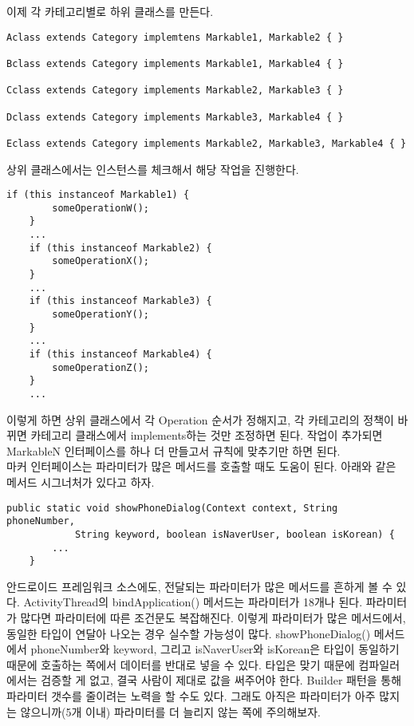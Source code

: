  
이제 각 카테고리별로 하위 클래스를 만든다.

\begin{lstlisting}[frame=single]
Aclass extends Category implemtens Markable1, Markable2 { }

Bclass extends Category implements Markable1, Markable4 { }

Cclass extends Category implements Markable2, Markable3 { }

Dclass extends Category implements Markable3, Markable4 { }

Eclass extends Category implements Markable2, Markable3, Markable4 { }
\end{lstlisting}

 
상위 클래스에서는 인스턴스를 체크해서 해당 작업을 진행한다.
\begin{lstlisting}[frame=single]
	if (this instanceof Markable1) { 
		someOperationW();
	}
 	...
	if (this instanceof Markable2) { 
		someOperationX();
	}
	...
	if (this instanceof Markable3) { 
		someOperationY(); 
	} 
	...
	if (this instanceof Markable4) { 
		someOperationZ();
	}
	...
\end{lstlisting}
이렇게 하면 상위 클래스에서 각 Operation 순서가 정해지고, 
각 카테고리의 정책이 바뀌면 카테고리 클래스에서 implements하는 것만 조정하면 된다.
작업이 추가되면 MarkableN 인터페이스를 하나 더 만들고서 규칙에 맞추기만 하면 된다.\\

마커 인터페이스는 파라미터가 많은 메서드를 호출할 때도 도움이 된다.
아래와 같은 메서드 시그너처가 있다고 하자.
\begin{lstlisting}[frame=single]
	public static void showPhoneDialog(Context context, String phoneNumber, 
			String keyword, boolean isNaverUser, boolean isKorean) {
		...
	}
\end{lstlisting}

안드로이드 프레임워크 소스에도, 전달되는 파라미터가 많은 메서드를 흔하게 볼 수 있다. ActivityThread의 bindApplication() 메서드는 파라미터가 18개나 된다.
파라미터가 많다면 파라미터에 따른 조건문도 복잡해진다.
이렇게 파라미터가 많은 메서드에서, 동일한 타입이 연달아 나오는 경우 실수할 가능성이 많다. 
showPhoneDialog() 메서드에서 phoneNumber와 keyword, 그리고 isNaverUser와 isKorean은 타입이 동일하기 때문에 호출하는 쪽에서 데이터를 반대로 넣을 수 있다.
타입은 맞기 때문에 컴파일러에서는 검증할 게 없고, 결국 사람이 제대로 값을 써주어야 한다.
Builder 패턴을 통해 파라미터 갯수를 줄이려는 노력을 할 수도 있다. 그래도 아직은 파라미터가 아주 많지는 않으니까(5개 이내) 파라미터를 더 늘리지 않는 쪽에 주의해보자.\\

